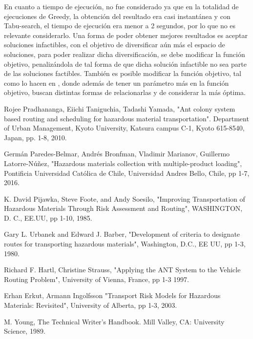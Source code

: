 \documentclass[conference]{IEEEtran}
\begin{document}
En cuanto a tiempo de ejecuci\'on, no fue considerado ya que en la totalidad de ejecuciones de Greedy, la obtenci\'on del resultado era casi instant\'anea y con Tabu-search, el tiempo de ejecuci\'on era menor a 2 segundos, por lo que no es relevante considerarlo. Una forma de poder obtener mejores resultados es aceptar soluciones infactibles, con el objetivo de diversificar a\'un m\'as el espacio de soluciones, para poder realizar dicha diversificaci\'on, se debe modificar la funci\'on objetivo, penaliz\'andola de tal forma de que dicha soluci\'on infactible no sea parte de las soluciones factibles. Tambi\'en es posible modificar la funci\'on objetivo, tal como lo hacen en \cite{b1}, donde adem\'as de tener un par\'ametro m\'as en la funci\'on objetivo, buscan distintas formas de relacionarlas y de considerar la m\'as \'optima.


\begin{thebibliography}{00}
 Rojee Pradhananga, Eiichi Taniguchia, Tadashi Yamada, "Ant colony system based routing and scheduling for hazardous
material transportation". Department of Urban Management, Kyoto University, Katsura campus C-1, Kyoto 615-8540, Japan, pp. 1-8, 2010.

 Germ\'an Paredes-Belmar, Andr\'es Bronfman, Vladimir Marianov, Guillermo Latorre-N\'u\~nez, "Hazardous materials collection with multiple-product loading", Pontificia Universidad Cat\'olica de Chile, Universidad Andres Bello, Chile, pp 1-7, 2016.

 K. David Pijawka, Steve Foote, and Andy Soesilo, "Improving Transportation of Hazardous Materials Through Risk Assessment and Routing", WASHINGTON, D. C., EE.UU, pp 1-10, 1985.

 Gary L. Urbanek and Edward J. Barber, "Development of criteria to designate routes for transporting hazardous materials", Washington, D.C., EE UU, pp 1-3, 1980.


 Richard F. Hartl, Christine Strauss, "Applying the ANT System to the Vehicle Routing Problem", University of Vienna, France, pp 1-3 1997.

 Erhan Erkut, Armann Ingolfsson "Transport Risk Models for Hazardous Materials: Revisited", University of Alberta, pp 1-3, 2003.



 M. Young, The Technical Writer's Handbook. Mill Valley, CA: University Science, 1989.
\end{thebibliography}
\vspace{12pt}
\end{document}
